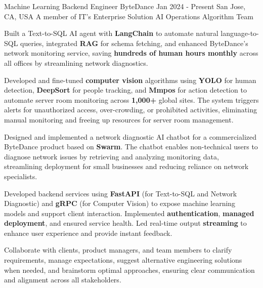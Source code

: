 
\begin{cventries}
  \cventry
    {Machine Learning Backend Engineer} %
    {ByteDance} %
    {Jan 2024 - Present} %
    {San Jose, CA, USA} %
    {A member of IT's Enterprise Solution AI Operations Algorithm Team}
    {
      \begin{cvitems} %
        \item {Built a Text-to-SQL AI agent with \textbf{LangChain} to automate natural language-to-SQL queries, integrated \textbf{RAG} for schema fetching, and enhanced ByteDance’s network monitoring service, saving \textbf{hundreds of human hours monthly} across all offices by streamlining network diagnostics.}
        \item {Developed and fine-tuned \textbf{computer vision} algorithms using \textbf{YOLO} for human detection, \textbf{DeepSort} for people tracking, and \textbf{Mmpos} for action detection to automate server room monitoring across \textbf{1,000+} global sites. The system triggers alerts for unauthorized access, over-crowding, or prohibited activities, eliminating manual monitoring and freeing up resources for server room management.}
        \item {Designed and implemented a network diagnostic AI chatbot for a commercialized ByteDance product based on \textbf{Swarm}. The chatbot enables non-technical users to diagnose network issues by retrieving and analyzing monitoring data, streamlining deployment for small businesses and reducing reliance on network specialists.}
        \item {Developed backend services using \textbf{FastAPI} (for Text-to-SQL and Network Diagnostic) and \textbf{gRPC} (for Computer Vision) to expose machine learning models and support client interaction. Implemented \textbf{authentication}, \textbf{managed deployment}, and ensured service health. Led real-time output \textbf{streaming} to enhance user experience and provide instant feedback.
        }
        \item {Collaborate with clients, product managers, and team members to clarify requirements, manage expectations, suggest alternative engineering solutions when needed, and brainstorm optimal approaches, ensuring clear communication and alignment across all stakeholders.}

\end{cvitems}}
\end{cventries}
